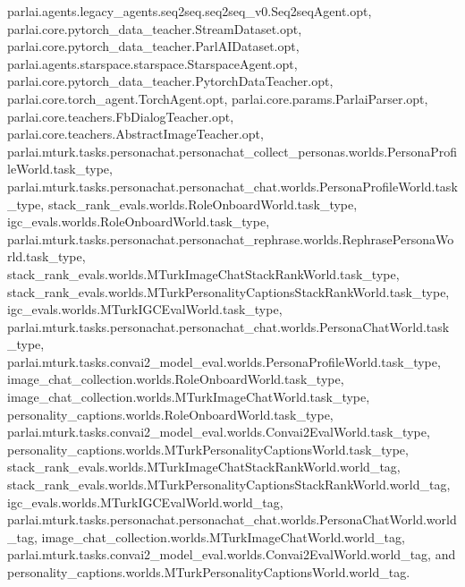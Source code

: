 parlai.\+agents.\+legacy\+\_\+agents.\+seq2seq.\+seq2seq\+\_\+v0.\+Seq2seq\+Agent.\+opt, parlai.\+core.\+pytorch\+\_\+data\+\_\+teacher.\+Stream\+Dataset.\+opt, parlai.\+core.\+pytorch\+\_\+data\+\_\+teacher.\+Parl\+A\+I\+Dataset.\+opt, parlai.\+agents.\+starspace.\+starspace.\+Starspace\+Agent.\+opt, parlai.\+core.\+pytorch\+\_\+data\+\_\+teacher.\+Pytorch\+Data\+Teacher.\+opt, parlai.\+core.\+torch\+\_\+agent.\+Torch\+Agent.\+opt, parlai.\+core.\+params.\+Parlai\+Parser.\+opt, parlai.\+core.\+teachers.\+Fb\+Dialog\+Teacher.\+opt, parlai.\+core.\+teachers.\+Abstract\+Image\+Teacher.\+opt, parlai.\+mturk.\+tasks.\+personachat.\+personachat\+\_\+collect\+\_\+personas.\+worlds.\+Persona\+Profile\+World.\+task\+\_\+type, parlai.\+mturk.\+tasks.\+personachat.\+personachat\+\_\+chat.\+worlds.\+Persona\+Profile\+World.\+task\+\_\+type, stack\+\_\+rank\+\_\+evals.\+worlds.\+Role\+Onboard\+World.\+task\+\_\+type, igc\+\_\+evals.\+worlds.\+Role\+Onboard\+World.\+task\+\_\+type, parlai.\+mturk.\+tasks.\+personachat.\+personachat\+\_\+rephrase.\+worlds.\+Rephrase\+Persona\+World.\+task\+\_\+type, stack\+\_\+rank\+\_\+evals.\+worlds.\+M\+Turk\+Image\+Chat\+Stack\+Rank\+World.\+task\+\_\+type, stack\+\_\+rank\+\_\+evals.\+worlds.\+M\+Turk\+Personality\+Captions\+Stack\+Rank\+World.\+task\+\_\+type, igc\+\_\+evals.\+worlds.\+M\+Turk\+I\+G\+C\+Eval\+World.\+task\+\_\+type, parlai.\+mturk.\+tasks.\+personachat.\+personachat\+\_\+chat.\+worlds.\+Persona\+Chat\+World.\+task\+\_\+type, parlai.\+mturk.\+tasks.\+convai2\+\_\+model\+\_\+eval.\+worlds.\+Persona\+Profile\+World.\+task\+\_\+type, image\+\_\+chat\+\_\+collection.\+worlds.\+Role\+Onboard\+World.\+task\+\_\+type, image\+\_\+chat\+\_\+collection.\+worlds.\+M\+Turk\+Image\+Chat\+World.\+task\+\_\+type, personality\+\_\+captions.\+worlds.\+Role\+Onboard\+World.\+task\+\_\+type, parlai.\+mturk.\+tasks.\+convai2\+\_\+model\+\_\+eval.\+worlds.\+Convai2\+Eval\+World.\+task\+\_\+type, personality\+\_\+captions.\+worlds.\+M\+Turk\+Personality\+Captions\+World.\+task\+\_\+type, stack\+\_\+rank\+\_\+evals.\+worlds.\+M\+Turk\+Image\+Chat\+Stack\+Rank\+World.\+world\+\_\+tag, stack\+\_\+rank\+\_\+evals.\+worlds.\+M\+Turk\+Personality\+Captions\+Stack\+Rank\+World.\+world\+\_\+tag, igc\+\_\+evals.\+worlds.\+M\+Turk\+I\+G\+C\+Eval\+World.\+world\+\_\+tag, parlai.\+mturk.\+tasks.\+personachat.\+personachat\+\_\+chat.\+worlds.\+Persona\+Chat\+World.\+world\+\_\+tag, image\+\_\+chat\+\_\+collection.\+worlds.\+M\+Turk\+Image\+Chat\+World.\+world\+\_\+tag, parlai.\+mturk.\+tasks.\+convai2\+\_\+model\+\_\+eval.\+worlds.\+Convai2\+Eval\+World.\+world\+\_\+tag, and personality\+\_\+captions.\+worlds.\+M\+Turk\+Personality\+Captions\+World.\+world\+\_\+tag.

